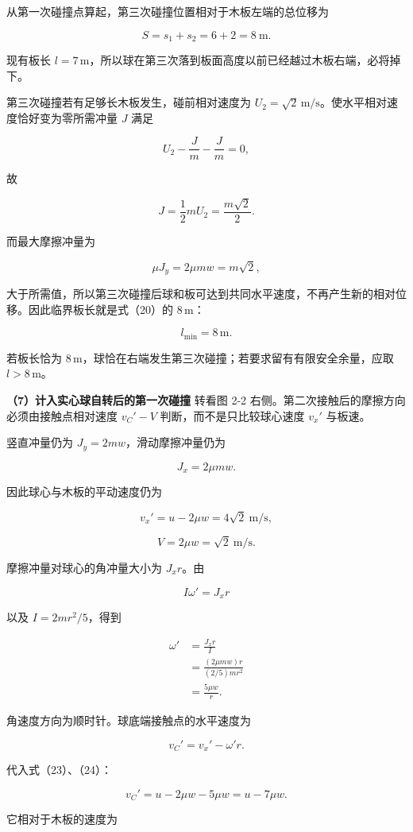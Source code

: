 \documentclass[12pt,a4paper,UTF8]{ctexart}
\begin{document}
从第一次碰撞点算起，第三次碰撞位置相对于木板左端的总位移为

\[S=s_1+s_2=6+2=8\ \mathrm m.\]

现有板长
\(l=7\,\mathrm m\)，所以球在第三次落到板面高度以前已经越过木板右端，必将掉下。

第三次碰撞若有足够长木板发生，碰前相对速度为
\(U_2=\sqrt2\,\mathrm{m/s}\)。使水平相对速度恰好变为零所需冲量 \(J\)
满足

\[U_2-\frac Jm-\frac Jm=0,\]

故

\[J=\frac12mU_2=\frac{m\sqrt2}{2}.\]

而最大摩擦冲量为

\[\mu J_y=2\mu mw=m\sqrt2,\]

大于所需值，所以第三次碰撞后球和板可达到共同水平速度，不再产生新的相对位移。因此临界板长就是式（20）的
\(8\,\mathrm m\)：

\[\boxed{l_{\min}=8\,\mathrm m}.\]

若板长恰为
\(8\,\mathrm m\)，球恰在右端发生第三次碰撞；若要求留有有限安全余量，应取
\(l>8\,\mathrm m\)。

\textbf{（7）计入实心球自转后的第一次碰撞} 转看图 2-2
右侧。第二次接触后的摩擦方向必须由接触点相对速度 \(v_C'-V\)
判断，而不是只比较球心速度 \(v_x'\) 与板速。

竖直冲量仍为 \(J_y=2mw\)，滑动摩擦冲量仍为

\[J_x=2\mu mw.\]

因此球心与木板的平动速度仍为

\[v_x'=u-2\mu w=4\sqrt2\ \mathrm{m/s},\]

\[V=2\mu w=\sqrt2\ \mathrm{m/s}.\]

摩擦冲量对球心的角冲量大小为 \(J_xr\)。由

\[I\omega'=J_xr\]

以及 \(I=2mr^2/5\)，得到

\[\begin{aligned}
\omega'
&=\frac{J_xr}{I}\\
&=\frac{(2\mu mw)r}{(2/5)mr^2}\\
&=\frac{5\mu w}{r}.
\end{aligned}\]

角速度方向为顺时针。球底端接触点的水平速度为

\[v_C'=v_x'-\omega'r.\]

代入式（23）、（24）：

\[v_C'=u-2\mu w-5\mu w=u-7\mu w.\]

它相对于木板的速度为
\end{document}
